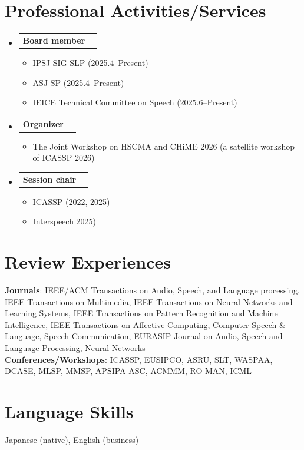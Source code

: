 \documentclass[letterpaper,11pt]{article}
\makeatletter
\newcommand{\resumeItem}[1]{
  \item\small{
    {#1 \vspace{-2pt}}
  }
}
\newcommand{\resumeShortSubheading}[2]{
  \vspace{-2pt}\item
    \begin{tabular*}{0.97\textwidth}[t]{l@{\extracolsep{\fill}}r}
      \textbf{#1} & #2 \\
    \end{tabular*}\vspace{-7pt}
}
\newcommand{\resumeSubHeadingListStart}{\begin{itemize}[leftmargin=0.15in, label={}]}
\newcommand{\resumeSubHeadingListEnd}{\end{itemize}}
\newcommand{\resumeItemListStart}{\begin{itemize}}
\newcommand{\resumeItemListEnd}{\end{itemize}\vspace{-5pt}}
\makeatother
\begin{document}
  
\section{Professional Activities/Services}
  \resumeSubHeadingListStart
    \resumeShortSubheading{Board member}{}{}
      \resumeItemListStart
        \resumeItem{IPSJ SIG-SLP (2025.4--Present)}
        \resumeItem{ASJ-SP (2025.4--Present)}
        \resumeItem{IEICE Technical Committee on Speech (2025.6--Present)}
      \resumeItemListEnd
    \resumeShortSubheading{Organizer}{}{}
      \resumeItemListStart
        \resumeItem{The Joint Workshop on HSCMA and CHiME 2026 (a satellite workshop of ICASSP 2026)}
      \resumeItemListEnd
    \resumeShortSubheading{Session chair}{}{}
      \resumeItemListStart
        \resumeItem{ICASSP (2022, 2025)}
        \resumeItem{Interspeech 2025)}
      \resumeItemListEnd
  \resumeSubHeadingListEnd
    
\section{Review Experiences}
 \begin{itemize}[leftmargin=0.15in, label={}]
    \small{\item{
     \textbf{Journals}{: IEEE/ACM Transactions on Audio, Speech, and Language processing, IEEE Transactions on Multimedia, IEEE Transactions on Neural Networks and Learning Systems, IEEE Transactions on Pattern Recognition and Machine Intelligence, IEEE Transactions on Affective Computing, Computer Speech \& Language, Speech Communication, EURASIP Journal on Audio, Speech and Language Processing, Neural Networks} \\
     \textbf{Conferences/Workshops}{: ICASSP, EUSIPCO, ASRU, SLT, WASPAA, DCASE, MLSP, MMSP, APSIPA ASC, ACMMM, RO-MAN, ICML}
    }}
 \end{itemize}
%

\section{Language Skills}
 \begin{itemize}[leftmargin=0.15in, label={}]
    \small{\item{Japanese (native), English (business)}}
 \end{itemize}

\end{document}
